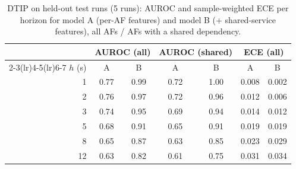 \begin{table}[t]
\centering
\footnotesize
\caption{DTIP on held-out test runs (5 runs): AUROC and sample-weighted ECE per horizon for model A (per-AF features) and model B (+ shared-service features), all AFs / AFs with a shared dependency.}
\label{tab:dtip}
\setlength{\tabcolsep}{3pt}
\begin{tabular}{rcccccc}
\toprule
 & \multicolumn{2}{c}{AUROC (all)} & \multicolumn{2}{c}{AUROC (shared)} & \multicolumn{2}{c}{ECE (all)} \\
\cmidrule(lr){2-3}\cmidrule(lr){4-5}\cmidrule(lr){6-7}
$h$ (s) & A & B & A & B & A & B \\
\midrule
1 & 0.77 & 0.99 & 0.72 & 1.00 & 0.008 & 0.002 \\
2 & 0.76 & 0.97 & 0.72 & 0.96 & 0.012 & 0.006 \\
3 & 0.74 & 0.95 & 0.69 & 0.94 & 0.014 & 0.012 \\
5 & 0.68 & 0.91 & 0.65 & 0.91 & 0.019 & 0.019 \\
8 & 0.65 & 0.87 & 0.63 & 0.85 & 0.023 & 0.029 \\
12 & 0.63 & 0.82 & 0.61 & 0.75 & 0.031 & 0.034 \\
\bottomrule
\end{tabular}
\end{table}
